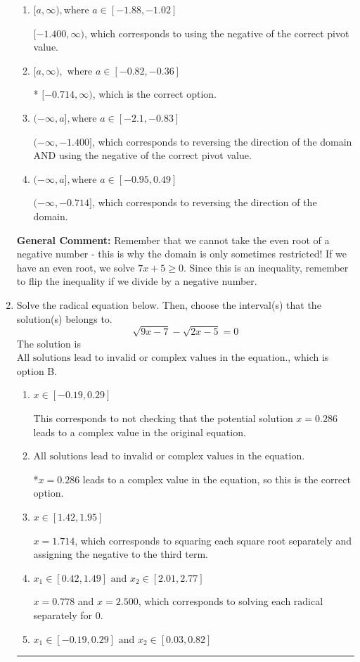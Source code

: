 \documentclass{extbook}[14pt]
\newcommand{\litem}[1]{\item #1

\rule{\textwidth}{0.4pt}}
\begin{document}
\begin{enumerate}
{\begin{enumerate}[label=\Alph*.]
This corresponds to the radical having an odd power, but the radical for this question is even.
\item \( [a, \infty), \text{where } a \in [-1.88, -1.02] \)

$[-1.400, \infty)$, which corresponds to using the negative of the correct pivot value.
\item \( [a, \infty), \text{ where } a \in [-0.82, -0.36] \)

* $[-0.714, \infty)$, which is the correct option.
\item \( (-\infty, a], \text{where } a \in [-2.1, -0.83] \)

$(-\infty, -1.400]$, which corresponds to reversing the direction of the domain AND using the negative of the correct pivot value.
\item \( (-\infty, a], \text{where } a \in [-0.95, 0.49] \)

 $(-\infty, -0.714]$, which corresponds to reversing the direction of the domain.
\end{enumerate}

\textbf{General Comment:} Remember that we cannot take the even root of a negative number - this is why the domain is only sometimes restricted! If we have an even root, we solve $7 x + 5 \geq 0$. Since this is an inequality, remember to flip the inequality if we divide by a negative number.
}
\litem{
Solve the radical equation below. Then, choose the interval(s) that the solution(s) belongs to.
\[ \sqrt{9 x - 7} - \sqrt{2 x - 5} = 0 \]The solution is \( \text{All solutions lead to invalid or complex values in the equation.} \), which is option B.\begin{enumerate}[label=\Alph*.]
\item \( x \in [-0.19,0.29] \)

This corresponds to not checking that the potential solution $x = 0.286$ leads to a complex value in the original equation.
\item \( \text{All solutions lead to invalid or complex values in the equation.} \)

*$x = 0.286$ leads to a complex value in the equation, so this is the correct option.
\item \( x \in [1.42,1.95] \)

$x = 1.714$, which corresponds to squaring each square root separately and assigning the negative to the third term.
\item \( x_1 \in [0.42, 1.49] \text{ and } x_2 \in [2.01,2.77] \)

$x = 0.778$ and $x = 2.500$, which corresponds to solving each radical separately for 0.
\item \( x_1 \in [-0.19, 0.29] \text{ and } x_2 \in [0.03,0.82] \)


\end{enumerate}}
\end{enumerate}
\end{document}
